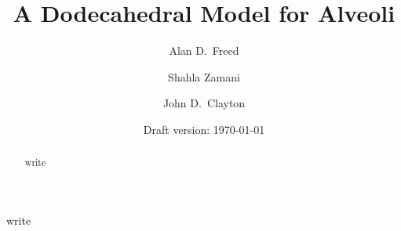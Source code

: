 \documentclass[final,3p,12pt]{elsarticle}
\begin{document}
\begin{frontmatter}



\title{A Dodecahedral Model for Alveoli}


\author[add1,add2]{Alan D.~Freed}



\author[add1]{Shahla Zamani}

\author[add2]{John D.~Clayton}


\date{Draft version: \today}

\address[add1]{Department of Mechanical Engineering, 
              Texas A\&M University,
              College Station, \\ TX 77843, 
              United States}
          
\address[add2]{Impact Physics Branch, 
               U.S.\ Army Research Laboratory,
               Aberdeen Proving Ground, 
               Aberdeen, MD 21005, 
               United States}
              
              
\begin{abstract}

write

\end{abstract}

\begin{keyword}

write



\end{keyword}

\end{frontmatter}
\end{document}
